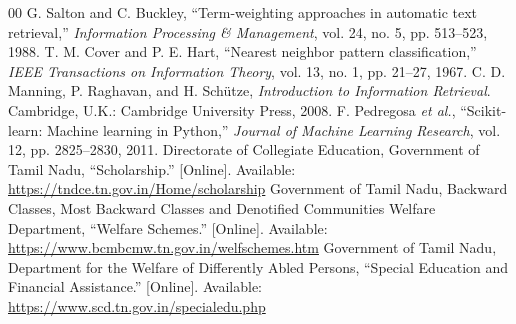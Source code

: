 \documentclass[conference]{IEEEtran}
\begin{document}
\begin{thebibliography}{00}
 G. Salton and C. Buckley, ``Term-weighting approaches in automatic text retrieval,'' \emph{Information Processing \& Management}, vol. 24, no. 5, pp. 513--523, 1988.
 T. M. Cover and P. E. Hart, ``Nearest neighbor pattern classification,'' \emph{IEEE Transactions on Information Theory}, vol. 13, no. 1, pp. 21--27, 1967.
 C. D. Manning, P. Raghavan, and H. Sch\"utze, \emph{Introduction to Information Retrieval}. Cambridge, U.K.: Cambridge University Press, 2008.
 F. Pedregosa \emph{et al.}, ``Scikit-learn: Machine learning in Python,'' \emph{Journal of Machine Learning Research}, vol. 12, pp. 2825--2830, 2011.
 Directorate of Collegiate Education, Government of Tamil Nadu, ``Scholarship.'' [Online]. Available: \url{https://tndce.tn.gov.in/Home/scholarship}
 Government of Tamil Nadu, Backward Classes, Most Backward Classes and Denotified Communities Welfare Department, ``Welfare Schemes.'' [Online]. Available: \url{https://www.bcmbcmw.tn.gov.in/welfschemes.htm}
 Government of Tamil Nadu, Department for the Welfare of Differently Abled Persons, ``Special Education and Financial Assistance.'' [Online]. Available: \url{https://www.scd.tn.gov.in/specialedu.php}
\end{thebibliography}

\balance
\end{document}
